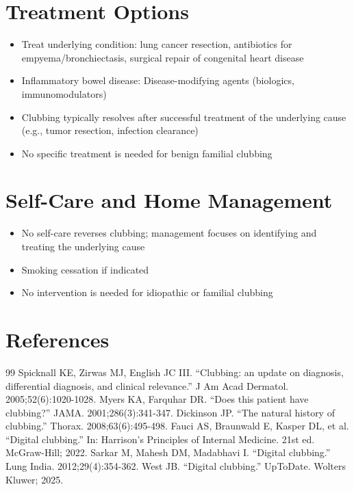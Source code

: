 \section*{Treatment Options}
\begin{itemize}
  \item Treat underlying condition: lung cancer resection, antibiotics for empyema/bronchiectasis, surgical repair of congenital heart disease
  \item Inflammatory bowel disease: Disease-modifying agents (biologics, immunomodulators)
  \item Clubbing typically resolves after successful treatment of the underlying cause (e.g., tumor resection, infection clearance)
  \item No specific treatment is needed for benign familial clubbing
\end{itemize}

\section*{Self-Care and Home Management}
\begin{itemize}
  \item No self-care reverses clubbing; management focuses on identifying and treating the underlying cause
  \item Smoking cessation if indicated
  \item No intervention is needed for idiopathic or familial clubbing
\end{itemize}

\section*{References}
\begin{thebibliography}{99}
 Spicknall KE, Zirwas MJ, English JC III. ``Clubbing: an update on diagnosis, differential diagnosis, and clinical relevance.'' J Am Acad Dermatol. 2005;52(6):1020-1028.
 Myers KA, Farquhar DR. ``Does this patient have clubbing?'' JAMA. 2001;286(3):341-347.
 Dickinson JP. ``The natural history of clubbing.'' Thorax. 2008;63(6):495-498.
 Fauci AS, Braunwald E, Kasper DL, et al. ``Digital clubbing.'' In: Harrison's Principles of Internal Medicine. 21st ed. McGraw-Hill; 2022.
 Sarkar M, Mahesh DM, Madabhavi I. ``Digital clubbing.'' Lung India. 2012;29(4):354-362.
 West JB. ``Digital clubbing.'' UpToDate. Wolters Kluwer; 2025.
\end{thebibliography}
